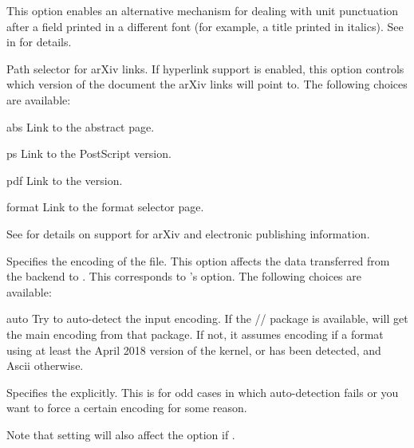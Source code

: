 \documentclass{ltxdockit}[2011/03/25]
\newcommand*{\biber}{\sty{biber}\xspace}
\newcommand*{\biblatex}{\sty{biblatex}\xspace}
\begin{document}
\begin{optionlist}

This option enables an alternative mechanism for dealing with unit punctuation after a field printed in a different font (for example, a title printed in italics). See  in  for details.


Path selector for arXiv links. If hyperlink support is enabled, this option controls which version of the document the arXiv  links will point to. The following choices are available:

\begin{valuelist}
\item[abs] Link to the abstract page.
\item[ps] Link to the PostScript version.
\item[pdf] Link to the \pdf version.
\item[format] Link to the format selector page.
\end{valuelist}

See  for details on support for arXiv and electronic publishing information.


Specifies the encoding of the  file. This option affects the data transferred from the backend to \biblatex. This corresponds to \biber's  option. The following choices are available:

\begin{valuelist}

\item[auto] Try to auto-detect the input encoding. If the \slash {}\slash {} package is available, \biblatex will get the main encoding from that package. If not, it assumes \utf encoding if a \latex format using at least the April 2018 version of the kernel, \xetex or \luatex has been detected, and Ascii otherwise.

\item[\prm{encoding}] Specifies the  explicitly. This is for odd cases in which auto-detection fails or you want to force a certain encoding for some reason.

\end{valuelist}
%
Note that setting  will also affect the  option if .


\end{optionlist}
\end{document}
